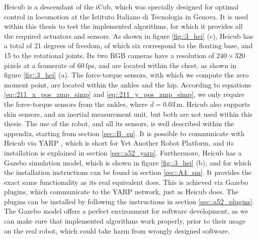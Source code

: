 \label{sec::3_he}
Heicub is a descendant of the iCub, which was specially designed for optimal control in locomotion at the Istituto Italiano di Tecnologia in Genova. It is used within this thesis to test the implemented algorithms, for which it provides all the required actuators and sensors. As shown in figure \ref{fig::3_hei} (c), Heicub has a total of 21 degrees of freedom, of which six correspond to the floating base, and 15 to the rotational joints. Its two RGB cameras have a resolution of $240\times320$ pixels at a framerate of $60\,\text{fps}$, and are located within the chest, as shown in figure \ref{fig::3_hei} (a). The force-torque sensors, with which we compute the zero moment point, are located within the ankles and the hip. According to equations \ref{eq::211_x_pos_zmp_simp} and \ref{eq::211_y_pos_zmp_simp}, we only require the force-torque sensors from the ankles, where $d=0.03\,\text{m}$. Heicub also supports skin sensors, and an inertial measurement unit, but both are not used within this thesis. The use of the robot, and all its sensors, is well described within the appendix, starting from section \ref{sec::B_su}. It is possible to communicate with Heicub via YARP \cite{metta2006yarp}, which is short for Yet Another Robot Platform, and its installation is explained in section \ref{sec::a52_yarp}. Furthermore, Heicub has a Gazebo \cite{koenig2004design} simulation model, which is shown in figure \ref{fig::3_hei} (b), and for which the installation instructions can be found in section \ref{sec::A4_sm}. It provides the exact same functionality as its real equivalent does. This is achieved via Gazebo plugins, which communicate to the YARP network, just as Heicub does. The plugins can be installed by following the instructions in section \ref{sec::a52_plugins}. The Gazebo model offers a perfect environment for software development, as we can make sure that implemented algorithms work properly, prior to their usage on the real robot, which could take harm from wrongly designed software.
